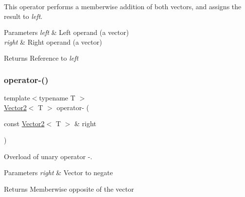 This operator performs a memberwise addition of both vectors, and assigns the result to {\itshape left}.


\begin{DoxyParams}{Parameters}
{\em left} & Left operand (a vector) \\
\hline
{\em right} & Right operand (a vector)\\
\hline
\end{DoxyParams}
\begin{DoxyReturn}{Returns}
Reference to {\itshape left} 
\end{DoxyReturn}
\mbox{\label{classsf_1_1_vector2_a3885c2e66dc427cec7eaa178d59d8e8b}} 
\subsubsection{\texorpdfstring{operator-\/()}{operator-()}\hspace{0.1cm}{\footnotesize\ttfamily [1/2]}}
{\footnotesize\ttfamily template$<$typename T $>$ \\
\hyperlink{classsf_1_1_vector2}{Vector2}$<$ T $>$ operator-\/ (\begin{DoxyParamCaption}\item[{const \hyperlink{classsf_1_1_vector2}{Vector2}$<$ T $>$ \&}]{right }\end{DoxyParamCaption})\hspace{0.3cm}{\ttfamily [related]}}



Overload of unary operator -\/. 


\begin{DoxyParams}{Parameters}
{\em right} & Vector to negate\\
\hline
\end{DoxyParams}
\begin{DoxyReturn}{Returns}
Memberwise opposite of the vector 
\end{DoxyReturn}
\mbox{\label{classsf_1_1_vector2_ad027adae53ec547a86c20deeb05c9e85}} 
